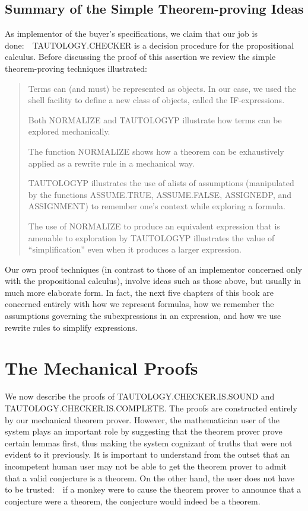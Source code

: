 \documentclass[10pt]{book}
\newenvironment{pubcrown}{\begin{quote}}{\end{quote}}
\begin{document}
\subsection{Summary of the Simple Theorem-proving Ideas}
As implementor of the buyer's specifications, we claim that our
job is done:~~TAUTOLOGY.CHECKER is a decision procedure
for the propositional calculus.  Before discussing the proof of this assertion we review the
simple theorem-proving techniques illustrated:
\begin{pubcrown}
Terms can (and must) be represented as objects.  In our case, we
used the shell facility to define a new class of objects, called
the IF-expressions.

Both NORMALIZE and TAUTOLOGYP illustrate how terms can be explored
mechanically.

The function NORMALIZE shows how a theorem can be exhaustively
applied as a rewrite rule in a mechanical way.

TAUTOLOGYP illustrates the use of alists of assumptions (manipulated
by the functions ASSUME.TRUE, ASSUME.FALSE, ASSIGNEDP, and ASSIGNMENT)
to remember one's context while exploring a formula.

The use of NORMALIZE to produce an equivalent
expression that is amenable to exploration by TAUTOLOGYP illustrates the
value of ``simplification'' even when it produces a larger expression.
\end{pubcrown}

Our own proof techniques (in contrast to those of an implementor
concerned only with the propositional calculus),  involve ideas such as those
above, but usually in much more elaborate
form.  In fact, the next five chapters of this book
are concerned entirely with how we represent formulas, how we remember the assumptions governing
the subexpressions in an expression, and how we use rewrite
rules to simplify expressions.

\section{The Mechanical Proofs}
We now describe the proofs of TAUTOLOGY.CHECKER.IS.SOUND
and TAUTOLOGY.CHECKER.IS.COMPLETE.  The proofs are constructed entirely by our
mechanical theorem prover.  However, the mathematician user of the system
plays an important role by suggesting that the theorem prover prove
certain lemmas first, thus making the system cognizant of truths that were not
evident to it previously.  It is important to understand from the outset
that an incompetent human user may not be able to get the theorem prover
to admit that a valid conjecture is a theorem.  On the other hand, the
user does not have to be trusted:~~if a monkey were to cause the theorem prover
to announce that a conjecture were a theorem, the conjecture would indeed
be a theorem.
\end{document}
